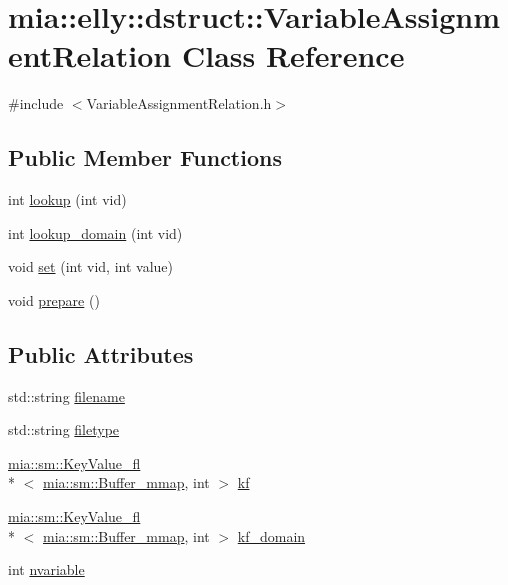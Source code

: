 \hypertarget{classmia_1_1elly_1_1dstruct_1_1_variable_assignment_relation}{\section{mia\-:\-:elly\-:\-:dstruct\-:\-:Variable\-Assignment\-Relation Class Reference}
\label{classmia_1_1elly_1_1dstruct_1_1_variable_assignment_relation}
}


{\ttfamily \#include $<$Variable\-Assignment\-Relation.\-h$>$}

\subsection*{Public Member Functions}
\begin{DoxyCompactItemize}
\item 
int \hyperlink{classmia_1_1elly_1_1dstruct_1_1_variable_assignment_relation_adae435f1b7fe6ccbf4857d3a19a0f88a}{lookup} (int vid)
\item 
int \hyperlink{classmia_1_1elly_1_1dstruct_1_1_variable_assignment_relation_ad8c41e6f6a09c0fa5bb7e01b48e49875}{lookup\-\_\-domain} (int vid)
\item 
void \hyperlink{classmia_1_1elly_1_1dstruct_1_1_variable_assignment_relation_a226adad0ad27177aeeda5df1f0064290}{set} (int vid, int value)
\item 
void \hyperlink{classmia_1_1elly_1_1dstruct_1_1_variable_assignment_relation_a745e2d0883b72b0b2140bbd0b791b0d2}{prepare} ()
\end{DoxyCompactItemize}
\subsection*{Public Attributes}
\begin{DoxyCompactItemize}
\item 
std\-::string \hyperlink{classmia_1_1elly_1_1dstruct_1_1_variable_assignment_relation_aa48ef4351b3b43eaa3323cb20abb3531}{filename}
\item 
std\-::string \hyperlink{classmia_1_1elly_1_1dstruct_1_1_variable_assignment_relation_a52e11bd663360277cfc7c7be61d79990}{filetype}
\item 
\hyperlink{classmia_1_1sm_1_1_key_value__fl}{mia\-::sm\-::\-Key\-Value\-\_\-fl}\\*
$<$ \hyperlink{classmia_1_1sm_1_1_buffer__mmap}{mia\-::sm\-::\-Buffer\-\_\-mmap}, int $>$ \hyperlink{classmia_1_1elly_1_1dstruct_1_1_variable_assignment_relation_a7e095b0ffcbf56d86e4fcc254a0039e8}{kf}
\item 
\hyperlink{classmia_1_1sm_1_1_key_value__fl}{mia\-::sm\-::\-Key\-Value\-\_\-fl}\\*
$<$ \hyperlink{classmia_1_1sm_1_1_buffer__mmap}{mia\-::sm\-::\-Buffer\-\_\-mmap}, int $>$ \hyperlink{classmia_1_1elly_1_1dstruct_1_1_variable_assignment_relation_afe97d67e61ae540774ef75c980c6a213}{kf\-\_\-domain}
\item 
int \hyperlink{classmia_1_1elly_1_1dstruct_1_1_variable_assignment_relation_ad2dca4f9ea916afc044726130e6f8312}{nvariable}
\end{DoxyCompactItemize}



